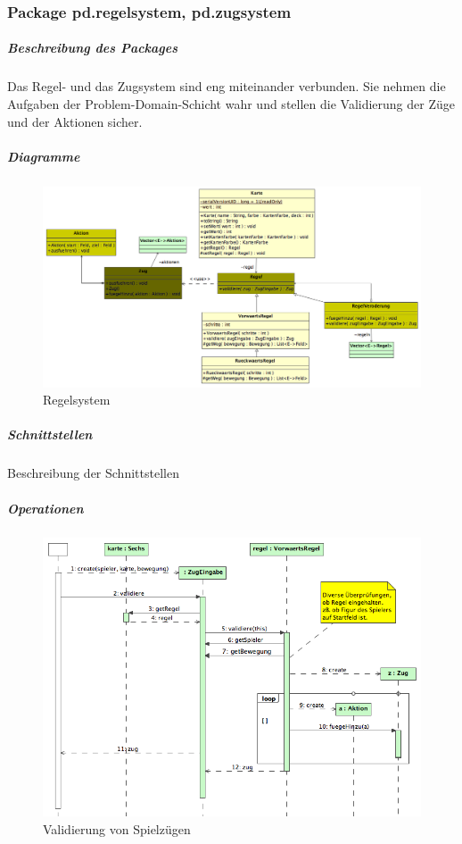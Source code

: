\documentclass[a4paper,12pt,halfparskip,DIV14]{scrartcl}
\begin{document}
\subsubsection{Package pd.regelsystem, pd.zugsystem} %
\label{ssub:package_pd_regelsystem}
\subparagraph{Beschreibung des Packages} %
\label{ssub:beschreibung_des_packages}
Das Regel- und das Zugsystem sind eng miteinander verbunden. Sie nehmen die Aufgaben der Problem-Domain-Schicht wahr und stellen die Validierung der Züge und der Aktionen sicher.
\subparagraph{Diagramme} %
\label{ssub:diagramme}
\begin{figure}
	[htp] \centering 
	\includegraphics[width=1\textwidth]{pd_regelsystem.png} \caption{Regelsystem}\label{fig:pd_regelsystem.png} 
\end{figure}
\subparagraph{Schnittstellen} %
\label{ssub:schnittstellen}
Beschreibung der Schnittstellen
\subparagraph{Operationen} %
\label{ssub:operationen}
\begin{figure}
	[htp] \centering 
	\includegraphics[width=1\textwidth]{pd_validierung.png} \caption{Validierung von Spielzügen}\label{fig:pd_validierung.png} 
\end{figure}
\end{document}
